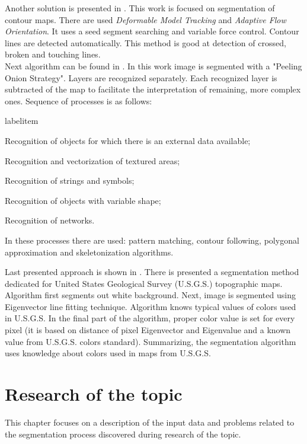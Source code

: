 \documentclass[a4paper,onecolumn,oneside,12pt]{memoir}
\makeatletter
\renewenvironment{itemize}{
  \begin{list}{  
  \csname labelitem\romannumeral\the\@listdepth\endcsname}{
  \setlength{\leftmargin}{1em}
	\setlength{\topsep}{6pt}%
	\setlength{\partopsep}{0pt}%
	\setlength{\parskip}{0pt}%
	\setlength{\parsep}{0pt}%
	\setlength{\itemsep}{0pt}}
}{
  \end{list}
}
\makeatother
\begin{document}
Another solution is presented in \cite{automaticVectorization}. This work is focused on segmentation
of contour maps. There are used \textit{Deformable Model Tracking} and \textit{Adaptive Flow 
Orientation}. It uses a seed segment searching and variable force control. Contour lines are 
detected automatically. This method is good at detection of crossed, broken and touching lines. \\

Next algorithm can be found in \cite{topographicMapsAutomaticVectorization}. In this work image is
segmented with a "Peeling Onion Strategy". Layers are recognized separately. Each recognized layer
is subtracted of the map to facilitate the interpretation of remaining, more complex ones. Sequence
of processes is as follows:

\begin{itemize}
  \item Recognition of objects for which there is an external data available;
  \item Recognition and vectorization of textured areas;
  \item Recognition of strings and symbols;
  \item Recognition of objects with variable shape;
  \item Recognition of networks.
\end{itemize}

In these processes there are used: pattern matching, contour following, polygonal approximation and
skeletonization algorithms.

Last presented approach is shown in \cite{colorMapSegmentation}. There is presented a segmentation
method dedicated for United States Geological Survey (U.S.G.S.) topographic maps. Algorithm first 
segments out white background. Next, image is segmented using Eigenvector line fitting technique.
Algorithm knows typical values of colors used in U.S.G.S. In the final part of the algorithm, proper
color value is set for every pixel (it is based on distance of pixel Eigenvector and Eigenvalue and
a known value from U.S.G.S. colors standard). Summarizing, the segmentation algorithm uses knowledge
about colors used in maps from U.S.G.S.

\chapter{Research of the topic}

This chapter focuses on a description of the input data and problems related to the segmentation
process discovered during research of the topic.
\end{document}
